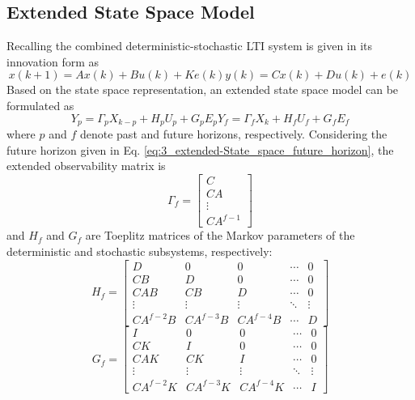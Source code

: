 \subsection{Extended State Space Model}\label{sec:extended_state_space_model}
Recalling the combined deterministic-stochastic LTI system is given in its innovation form as
\begin{subequations}
\begin{equation}x(k+1) = Ax(k) + Bu(k) + Ke(k)\end{equation}
\begin{equation}y(k) = Cx(k) + Du(k) + e(k)\end{equation}
\end{subequations}
Based on the state space representation, an extended state space model can be formulated as
\begin{subequations}
\begin{equation}Y_p = \Gamma_p X_{k-p} + H_p U_p + G_p E_p\end{equation}
\begin{equation}Y_f = \Gamma_f X_k + H_f U_f + G_f E_f\label{eq:3_extended-State_space_future_horizon}\end{equation}
\end{subequations}
where $p$ and $f$ denote past and future horizons, respectively. Considering the future horizon given in Eq. \ref{eq:3_extended-State_space_future_horizon}, the extended observability matrix is
\begin{equation*}
\Gamma_f = \begin{bmatrix}C\\ CA\\ \vdots\\ CA^{f-1}\end{bmatrix}
\end{equation*}
and $H_f$ and $G_f$ are Toeplitz matrices of the Markov parameters of the deterministic and stochastic subsystems, respectively:
\begin{equation*}
H_f = \begin{bmatrix}
D & 0 & 0 & \cdots & 0\\
CB & D & 0 & \cdots & 0\\
CAB & CB & D & \cdots & 0\\
\vdots & \vdots  & \vdots & \ddots & \vdots\\
CA^{f-2}B & CA^{f-3}B & CA^{f-4}B & \cdots & D
\end{bmatrix}
\end{equation*}
\begin{equation*}
G_f = \begin{bmatrix}
I & 0 & 0 & \cdots & 0\\
CK & I & 0 & \cdots & 0\\
CAK & CK & I & \cdots & 0\\
\vdots & \vdots  & \vdots & \ddots & \vdots\\
CA^{f-2}K & CA^{f-3}K & CA^{f-4}K & \cdots & I
\end{bmatrix}
\end{equation*}
